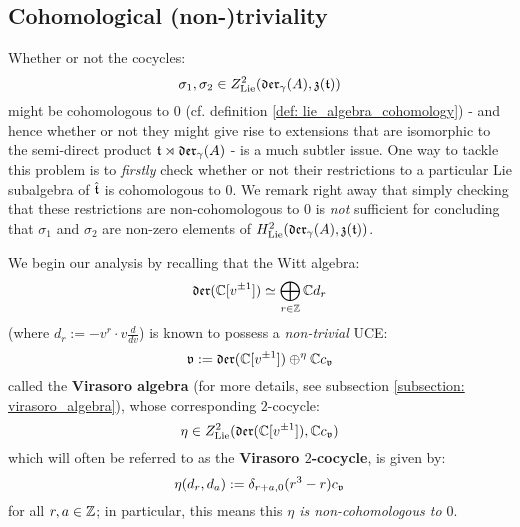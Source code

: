     \subsection{Cohomological (non-)triviality}
        Whether or not the cocycles:
            $$\sigma_1, \sigma_2 \in Z^2_{\mathrm{Lie}}(\mathfrak{der}_{\gamma}(A), \mathfrak{z}(\mathfrak{t}))$$
        might be cohomologous to $0$ (cf. definition \ref{def: lie_algebra_cohomology}) - and hence whether or not they might give rise to extensions that are isomorphic to the semi-direct product $\mathfrak{t} \rtimes \mathfrak{der}_{\gamma}(A)$ - is a much subtler issue. One way to tackle this problem is to \textit{firstly} check whether or not their restrictions to a particular Lie subalgebra of $\hat{\mathfrak{t}}$ is cohomologous to $0$. We remark right away that simply checking that these restrictions are non-cohomologous to $0$ is \textit{not} sufficient for concluding that $\sigma_1$ and $\sigma_2$ are non-zero elements of $H^2_{\mathrm{Lie}}(\mathfrak{der}_{\gamma}(A), \mathfrak{z}(\mathfrak{t}))$.

        We begin our analysis by recalling that the Witt algebra:
            $$\mathfrak{der}(\mathbb{C}[v^{\pm 1}]) \simeq \bigoplus_{r \in \mathbb{Z}} \mathbb{C} d_r$$
        (where $d_r := -v^r \cdot v\frac{d}{dv}$) is known to possess a \textit{non-trivial} UCE:
            $$\mathfrak{v} := \mathfrak{der}(\mathbb{C}[v^{\pm 1}]) \oplus^{\eta} \mathbb{C} c_{\mathfrak{v}}$$
        called the \textbf{Virasoro algebra} (for more details, see subsection \ref{subsection: virasoro_algebra}), whose corresponding $2$-cocycle:
            $$\eta \in Z^2_{\mathrm{Lie}}( \mathfrak{der}(\mathbb{C}[v^{\pm 1}]), \mathbb{C} c_{\mathfrak{v}} )$$
        which will often be referred to as the \textbf{Virasoro $2$-cocycle}, is given by:
            $$\eta(d_r, d_a) := \delta_{r + a, 0} (r^3 - r) c_{\mathfrak{v}}$$
        for all $r, a \in \mathbb{Z}$; in particular, this means this \textit{$\eta$ is non-cohomologous to $0$}. 

